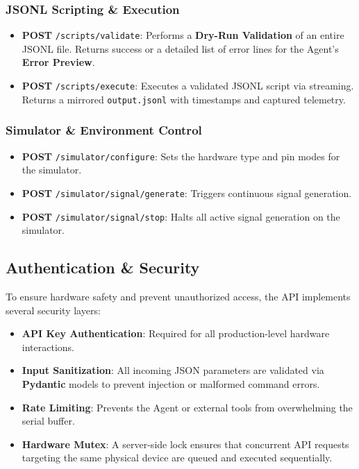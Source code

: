 \documentclass[conference]{IEEEtran}
\begin{document}
\subsubsection{JSONL Scripting \& Execution}
\begin{itemize}
    \item \textbf{POST} \texttt{/scripts/validate}: Performs a \textbf{Dry-Run Validation} of an entire JSONL file. Returns success or a detailed list of error lines for the Agent's \textbf{Error Preview}.
    \item \textbf{POST} \texttt{/scripts/execute}: Executes a validated JSONL script via streaming. Returns a mirrored \texttt{output.jsonl} with timestamps and captured telemetry.
\end{itemize}

\subsubsection{Simulator \& Environment Control}
\begin{itemize}
    \item \textbf{POST} \texttt{/simulator/configure}: Sets the hardware type and pin modes for the simulator.
    \item \textbf{POST} \texttt{/simulator/signal/generate}: Triggers continuous signal generation.
    \item \textbf{POST} \texttt{/simulator/signal/stop}: Halts all active signal generation on the simulator.
\end{itemize}

\subsection{Authentication \& Security}
To ensure hardware safety and prevent unauthorized access, the API implements several security layers:
\begin{itemize}
    \item \textbf{API Key Authentication}: Required for all production-level hardware interactions.
    \item \textbf{Input Sanitization}: All incoming JSON parameters are validated via \textbf{Pydantic} models to prevent injection or malformed command errors.
    \item \textbf{Rate Limiting}: Prevents the Agent or external tools from overwhelming the serial buffer.
    \item \textbf{Hardware Mutex}: A server-side lock ensures that concurrent API requests targeting the same physical device are queued and executed sequentially.
\end{itemize}
\end{document}

